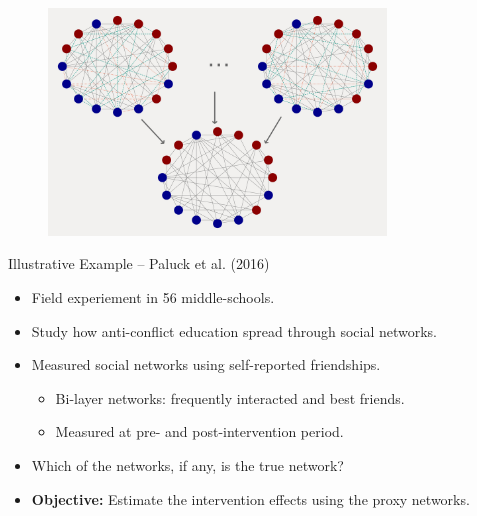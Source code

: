 \documentclass{beamer}
\begin{document}
    \begin{frame}[t]
        \begin{figure}[t]
            \centering
            \includegraphics[width=0.8\textwidth]{figs/noisy_networks.png}
        \end{figure}
    \end{frame}
    
    \begin{frame}{Illustrative Example -- Paluck et al. (2016)}
        \large
        \begin{itemize}
            \item<1-> Field experiement in 56 middle-schools.
            \vspace{0.2cm}
            \item<1-> Study how anti-conflict education spread through social networks.
            \vspace{0.2cm}
            \item<1-> Measured social networks using self-reported friendships.
            \begin{itemize}
                \item Bi-layer networks: frequently interacted and best friends.
                \vspace{0.05cm}
                \item Measured at pre- and post-intervention period.
            \end{itemize} 
            \vspace{0.2cm}
            \item<2-> Which of the networks, if any, is the true network?
            \vspace{0.2cm}
            \item<2-> \textbf{Objective:} Estimate the intervention effects using the proxy networks.
        \end{itemize}
    \end{frame}
    
\end{document}
